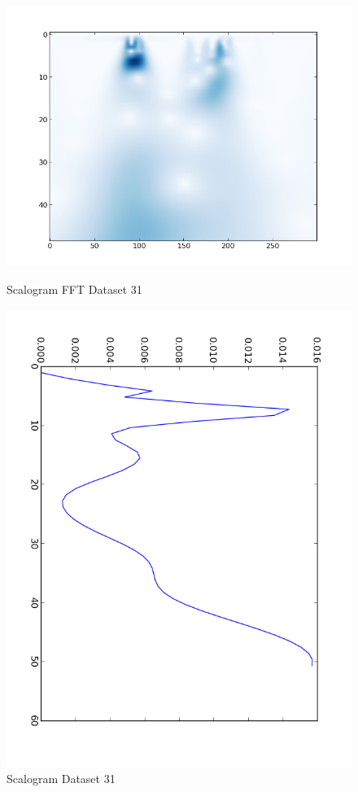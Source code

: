 \documentclass[pdftex,12pt,a4paper]{report}
\begin{document}
\newpage
\begin{figure}[!htb]
  \centering
  \begin{minipage}[b]{0.4\textwidth}
    \includegraphics[width=\textwidth]{scalogram/scalogramfft31.png}
    \caption{Scalogram FFT Dataset 31}
    \label{fig:scalogramfft31}
  \end{minipage}
  \hfill
  \begin{minipage}[b]{0.4\textwidth}
    \includegraphics[width=\textwidth]{scalogram/scalogramCWT31.png}
    \caption{Scalogram Dataset 31}
    \label{fig:scalogram31}
  \end{minipage}
\end{figure}
\end{document}
